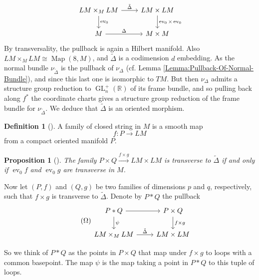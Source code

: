 \documentclass[reqno]{amsart}
\newtheorem{proposition}[theorem]{Proposition}
\theoremstyle{definition}
\newtheorem{definition}[theorem]{Definition}
\theoremstyle{remark}
\DeclareMathOperator{\GL}{GL}
\DeclareMathOperator{\Map}{Map}
\DeclareMathOperator{\ev}{ev}
\begin{document}
\begin{equation*}
\begin{tikzcd}
    LM \times_M LM \ar[d, "\ev_0"] 
    \ar[r, "\tilde{\Delta}"] & LM \times LM \ar[d, "\ev_0 \times 
    \ev_0"]\\
    M \ar[r, "\Delta"] & M \times M
\end{tikzcd}
\end{equation*}
By transversality, the pullback is again a Hilbert manifold.
Also $LM \times_M LM \cong \Map (8,M)$, 
and $\tilde{\Delta}$ is a codimension $d$ embedding.
As the normal bundle $\nu_{\tilde{\Delta}}$ is the pullback
of $\nu_{\Delta}$ (cf. Lemma \ref{Lemma:Pullback-Of-Normal-Bundle}),
and since this last one
is isomorphic to $TM$.
But then $\nu_{\Delta}$ admits a structure group reduction to
$\GL_n^{+}\left( \mathbb{R} \right) $ of its frame bundle,
and so pulling back along $f^{*}$ the coordinate charts gives
a structure group reduction of the frame bundle for
$\nu_{\tilde{\Delta}}$.
We deduce that $\tilde{\Delta}$ is 
an oriented morphism.  

\begin{definition}[]
    A family of closed string in $M$ is a smooth map
    \[
    f \colon P \to LM
    \] 
    from a compact oriented manifold $P$.
\end{definition}

\begin{proposition}[]\cite[Prop 2.3.7]{Chataur}
    The family $P \times Q \stackrel{f \times g}{\to} 
    LM \times LM$ is transverse to $\tilde{\Delta}$ if and only
    if $\ev_0 f$ and $\ev_0 g$ are transverse in $M$.
\end{proposition}

Now let 
$\left( P,f \right) $ and
$(Q,g)$ be two families of dimensions $p$ and $q$, respectively, such
that $f \times g$ is transverse to $\tilde{\Delta}$. Denote by
$P * Q$ the pullback
\begin{equation*}\tag{$\Omega$} \label{Eq:Omega}
\begin{tikzcd}
    P * Q \ar[r] \ar[d, "\psi "] & P \times Q \ar[d, "f\times g"]\\
    LM \times_M LM \ar[r, "\tilde{\Delta}"] & LM \times LM
\end{tikzcd}
\end{equation*}

So we think of $P * Q$ as the points
in $P \times Q$ that map under $f \times g$ to
loops with a common basepoint. 
The map $\psi$ is the map taking a point in $P * Q$ to this
tuple of loops.
\end{document}
